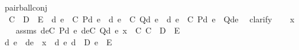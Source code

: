 \begin{isabellebody}
\endisatagproof
{\isafoldproof}%
%
\isadelimproof
\isanewline
%
\endisadelimproof
\isanewline
{}\isamarkupfalse%
\ pair{\isacharunderscore}{\kern0pt}ball{\isacharunderscore}{\kern0pt}conj\ {\isacharcolon}{\kern0pt}\ \isanewline
\ \ {\isachardoublequoteopen}C\ {\isasymsubseteq}\ D\ {\isasymtimes}\ E\ {\isasymLongrightarrow}\ {\isasymforall}{\isacharless}{\kern0pt}d{\isacharcomma}{\kern0pt}\ e{\isachargreater}{\kern0pt}\ {\isasymin}\ C{\isachardot}{\kern0pt}\ P{\isacharparenleft}{\kern0pt}d{\isacharcomma}{\kern0pt}\ e{\isacharparenright}{\kern0pt}\ {\isasymLongrightarrow}\ {\isasymforall}{\isacharless}{\kern0pt}d{\isacharcomma}{\kern0pt}\ e{\isachargreater}{\kern0pt}\ {\isasymin}\ C{\isachardot}{\kern0pt}\ Q{\isacharparenleft}{\kern0pt}d{\isacharcomma}{\kern0pt}\ e{\isacharparenright}{\kern0pt}\ {\isasymLongrightarrow}\ {\isasymforall}{\isacharless}{\kern0pt}d{\isacharcomma}{\kern0pt}\ e{\isachargreater}{\kern0pt}\ {\isasymin}\ C{\isachardot}{\kern0pt}\ P{\isacharparenleft}{\kern0pt}d{\isacharcomma}{\kern0pt}\ e{\isacharparenright}{\kern0pt}\ {\isasymand}\ Q{\isacharparenleft}{\kern0pt}d{\isacharcomma}{\kern0pt}e{\isacharparenright}{\kern0pt}{\isachardoublequoteclose}\ \isanewline
%
\isadelimproof
%
\endisadelimproof
%
\isatagproof
{}\isamarkupfalse%
\ {\isacharparenleft}{\kern0pt}clarify{\isacharparenright}{\kern0pt}\isanewline
\ \ \isamarkupfalse%
\ x\isanewline
\ \ \isamarkupfalse%
\ assms{\isacharcolon}{\kern0pt}\ {\isachardoublequoteopen}{\isasymforall}{\isasymlangle}d{\isacharcomma}{\kern0pt}e{\isasymrangle}{\isasymin}C{\isachardot}{\kern0pt}\ P{\isacharparenleft}{\kern0pt}d{\isacharcomma}{\kern0pt}\ e{\isacharparenright}{\kern0pt}{\isachardoublequoteclose}\ {\isachardoublequoteopen}{\isasymforall}{\isasymlangle}d{\isacharcomma}{\kern0pt}e{\isasymrangle}{\isasymin}C{\isachardot}{\kern0pt}\ Q{\isacharparenleft}{\kern0pt}d{\isacharcomma}{\kern0pt}\ e{\isacharparenright}{\kern0pt}{\isachardoublequoteclose}\ {\isachardoublequoteopen}x\ {\isasymin}\ C{\isachardoublequoteclose}\ {\isachardoublequoteopen}C\ {\isasymsubseteq}\ D\ {\isasymtimes}\ E{\isachardoublequoteclose}\ \isanewline
\ \ \isamarkupfalse%
\ \isamarkupfalse%
\ d\ e\ \ de\ {\isacharcolon}{\kern0pt}\ {\isachardoublequoteopen}x\ {\isacharequal}{\kern0pt}\ {\isacharless}{\kern0pt}d{\isacharcomma}{\kern0pt}\ e{\isachargreater}{\kern0pt}{\isachardoublequoteclose}\ {\isachardoublequoteopen}d\ {\isasymin}\ D{\isachardoublequoteclose}\ {\isachardoublequoteopen}e\ {\isasymin}\ E{\isachardoublequoteclose}\ \isamarkupfalse%

\end{isabellebody}
